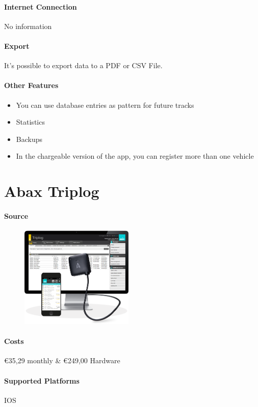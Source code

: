 \paragraph{Internet Connection} No information
\paragraph{Export} It’s possible to export data to a PDF or CSV File.
\paragraph{Other Features} 
\begin{itemize}
\item You can use database entries as pattern for future tracks
\item Statistics
\item Backups
\item In the chargeable version of the app, you can register more than one vehicle
\end{itemize}
\newpage

\section{Abax Triplog}
\paragraph{Source} 
\begin{figure}
  \begin{center}
    \includegraphics[width=0.48\textwidth]{abax}
  \end{center}
\end{figure}
\paragraph{Costs} \euro 35,29 monthly \& \euro 249,00 Hardware
\paragraph{Supported Platforms} IOS
